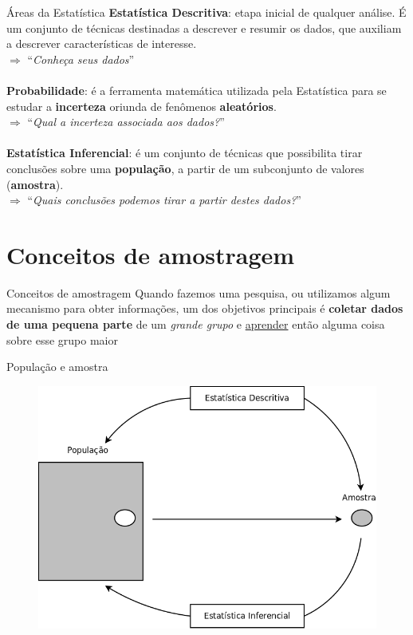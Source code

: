 \documentclass[10pt]{beamer}
\theoremstyle{definition}
\begin{document}
\begin{frame}{Áreas da Estatística}
  \textbf{Estatística Descritiva}: etapa inicial de qualquer análise. É
  um conjunto de técnicas destinadas a descrever e resumir os dados, que
  auxiliam a descrever características de interesse.\\
  $\Rightarrow$ ``\textit{Conheça seus dados}'' \\~\\
  \textbf{Probabilidade}: é a ferramenta matemática utilizada pela
  Estatística para se estudar a \textbf{incerteza} oriunda de fenômenos
  \textbf{aleatórios}. \\
  $\Rightarrow$ ``\textit{Qual a incerteza associada aos dados?}'' \\~\\
  \textbf{Estatística Inferencial}: é um conjunto de técnicas que
  possibilita tirar conclusões sobre uma \textbf{população}, a partir de
  um subconjunto de valores (\textbf{amostra}). \\
  $\Rightarrow$ ``\textit{Quais conclusões podemos tirar a partir destes
    dados?}''
\end{frame}

\section[Amostragem]{Conceitos de amostragem}

\begin{frame}{Conceitos de amostragem}
  Quando fazemos uma pesquisa, ou utilizamos algum mecanismo para obter
  informações, um dos objetivos principais é \textbf{coletar dados de
    uma pequena parte} de um \textsl{grande grupo} e
  \underline{aprender} então alguma coisa sobre esse grupo maior
\end{frame}

\begin{frame}{População e amostra}
  \begin{figure}[h]
    \centering
    \includegraphics[width=.9\textwidth]{../img/populacao_amostra.png}
  \end{figure}
\end{frame}
\end{document}
